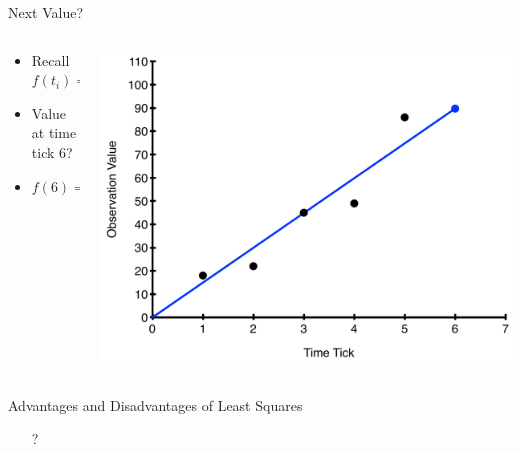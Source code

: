 \documentclass[aspectratio=169]{beamer}
\begin{document}
\begin{frame}{Next Value?}

\begin{columns} [T]
\begin{column}{0.5\textwidth}
\begin{itemize}
\item Recall $f(t_i) = m \times t_i$
\item Value at time tick 6? 
\item $f(6) = 14.96 \times 6 = 89.8$
\end{itemize}
\end{column}
\begin{column}{0.5\textwidth}
\includegraphics[width=1\textwidth]{lectModel2/LSReg1Line6.pdf}\\
\end{column}
\end{columns}

\end{frame}

\begin{frame}{Advantages and Disadvantages of Least Squares}
\begin{itemize}
\item[?]
\end{itemize}
\end{frame}
\end{document}
